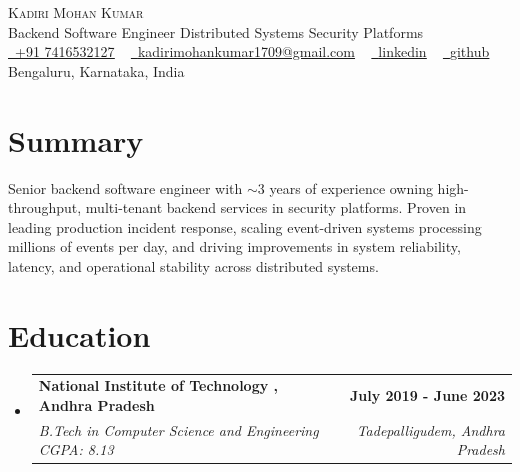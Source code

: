 \documentclass[letterpaper,11pt]{article}
\makeatletter
\newcommand{\resumeSubheading}[4]{
  \vspace{-2pt}\item
    \begin{tabular*}{1.0\textwidth}[t]{l@{\extracolsep{\fill}}r}
      \textbf{#1} & \textbf{\small #2} \\
      \textit{\small#3} & \textit{\small #4} \\
    \end{tabular*}\vspace{-7pt}
}
\newcommand{\resumeSubHeadingListStart}{\begin{itemize}[leftmargin=0.0in, label={}]}
\newcommand{\resumeSubHeadingListEnd}{\end{itemize}}
\makeatother
\begin{document}
\begin{center}
    {\Huge \scshape Kadiri Mohan Kumar} \\ \vspace{1pt}
    \small
    Backend Software Engineer \textbar{} Distributed Systems \textbar{} Security Platforms \\ \vspace{4pt}
    \href{tel:+917416532127} {\raisebox{-0.1\height}\faPhone\ \underline{+91 7416532127}} ~ \href{mailto:kadirimohankumar1709@gmail.com}{\raisebox{-0.2\height}\faEnvelope\  \underline{kadirimohankumar1709@gmail.com}} ~ 
    \href{https://www.linkedin.com/in/mohankumarkadiri/}{\raisebox{-0.2\height}\faLinkedin\ \underline{linkedin}}  ~
    \href{https://github.com/mohankumarkadiri}{\raisebox{-0.2\height}\faGithub\ \underline{github}}
    \\ \vspace{4pt}Bengaluru, Karnataka, India
    \vspace{-8pt}
\end{center}

\section{Summary}
Senior backend software engineer with $\sim$3 years of experience owning high-throughput, multi-tenant backend services in security platforms. Proven in leading production incident response, scaling event-driven systems processing millions of events per day, and driving improvements in system reliability, latency, and operational stability across distributed systems.



\section{Education}
  \resumeSubHeadingListStart
    \resumeSubheading
      {National Institute of Technology , Andhra Pradesh}{July 2019 - June 2023}
      {B.Tech in Computer Science and Engineering \textbar{} CGPA: 8.13}{Tadepalligudem, Andhra Pradesh}
  \resumeSubHeadingListEnd



\end{document}
